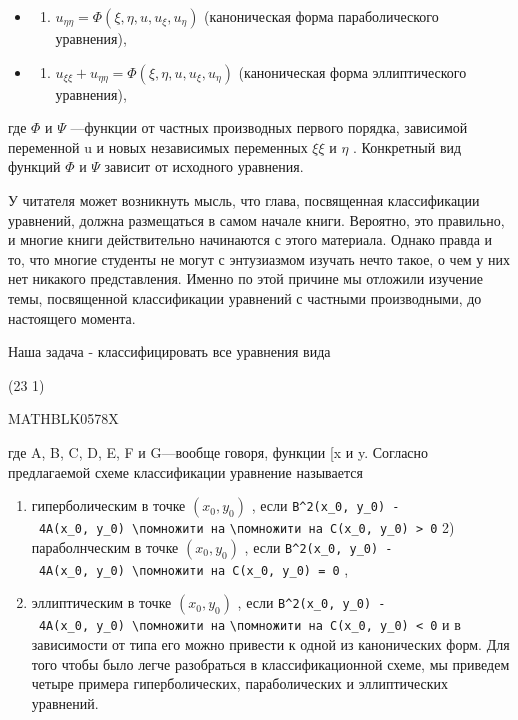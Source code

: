 \documentclass[
  ukrainian,
]{article}
\providecommand{\tightlist}{%
  \setlength{\itemsep}{0pt}\setlength{\parskip}{0pt}}
\begin{document}
\begin{itemize}
\tightlist
\item
  \begin{enumerate}
  \def\labelenumi{\arabic{enumi}.}
  \setcounter{enumi}{1}
  \tightlist
  \item
    \(u_{\eta\eta} = \Phi(\xi, \eta, u, u_{\xi}, u_{\eta})\)
    (каноническая форма параболического уравнения),
  \end{enumerate}
\item
  \begin{enumerate}
  \def\labelenumi{\arabic{enumi}.}
  \setcounter{enumi}{2}
  \tightlist
  \item
    \(u_{\xi\xi} + u_{\eta\eta} = \Phi(\xi, \eta, u, u_{\xi}, u_{\eta})\)
    (каноническая форма эллиптического уравнения),
  \end{enumerate}
\end{itemize}

где \(\Phi\) и \(\Psi\) ---функции от частных производных первого
порядка, зависимой переменной u и новых независимых переменных
\(\xi \xi\) и \(\eta\) . Конкретный вид функций \(\Phi\) и \(\Psi\)
зависит от исходного уравнения.

У читателя может возникнуть мысль, что глава, посвященная классификации
уравнений, должна размещаться в самом начале книги. Вероятно, это
правильно, и многие книги действительно начинаются с этого материала.
Однако правда и то, что многие студенты не могут с энтузиазмом изучать
нечто такое, о чем у них нет никакого представления. Именно по этой
причине мы отложили изучение темы, посвященной классификации уравнений с
частными производными, до настоящего момента.

Наша задача - классифицировать все уравнения вида

(23 1)

MATHBLK0578X

где A, B, C, D, E, F и G---вообще говоря, функции {[}x и y. Согласно
предлагаемой схеме классификации уравнение называется

\begin{enumerate}
\def\labelenumi{\arabic{enumi})}
\item
  гиперболическим в точке \((x_0, y_0)\) , если
  \texttt{B\^{}2(x\_0,\ y\_0)\ -\ 4A(x\_0,\ y\_0)\ \textbackslash{}помножити\ на}
  \texttt{\textbackslash{}помножити\ на\ C(x\_0,\ y\_0)\ \textgreater{}\ 0}
  2) параболнческим в точке \((x_0, y_0)\) , если
  \texttt{B\^{}2(x\_0,\ y\_0)\ -\ 4A(x\_0,\ y\_0)\ \textbackslash{}помножити\ на\ C(x\_0,\ y\_0)\ =\ 0}
  ,
\item
  эллиптическим в точке \((x_0, y_0)\) , если
  \texttt{B\^{}2(x\_0,\ y\_0)\ -\ 4A(x\_0,\ y\_0)\ \textbackslash{}помножити\ на}
  \texttt{\textbackslash{}помножити\ на\ C(x\_0,\ y\_0)\ \textless{}\ 0}
  и в зависимости от типа его можно привести к одной из канонических
  форм. Для того чтобы было легче разобраться в классификационной схеме,
  мы приведем четыре примера гиперболических, параболических и
  эллиптических уравнений.
\end{enumerate}
\end{document}
